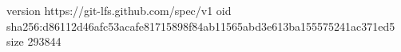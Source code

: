 version https://git-lfs.github.com/spec/v1
oid sha256:d86112d46afc53acafe81715898f84ab11565abd3e613ba155575241ac371ed5
size 293844
